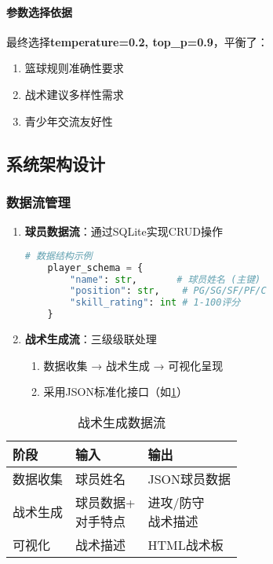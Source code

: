 \documentclass{article}
\theoremstyle{plain}
\theoremstyle{definition}
\theoremstyle{remark}
\begin{document}
\paragraph{参数选择依据}
最终选择\textbf{temperature=0.2, top\_p=0.9}，平衡了：
\begin{enumerate}
\item 篮球规则准确性要求
\item 战术建议多样性需求
\item 青少年交流友好性
\end{enumerate}


\subsection{系统架构设计}

\subsubsection{数据流管理}
\begin{enumerate}
    \item \textbf{球员数据流}：通过SQLite实现CRUD操作
    \begin{lstlisting}[language=Python]
    # 数据结构示例
    player_schema = {
        "name": str,       # 球员姓名 (主键)
        "position": str,    # PG/SG/SF/PF/C
        "skill_rating": int # 1-100评分
    }
    \end{lstlisting}
    
    \item \textbf{战术生成流}：三级级联处理
    \begin{enumerate}
        \item 数据收集 → 战术生成 → 可视化呈现
        \item 采用JSON标准化接口（如\cref{tactic-flow}）
    \end{enumerate}
\end{enumerate}

\begin{table}[h]
\caption{战术生成数据流}
\label{tactic-flow}
\centering
\begin{tabular}{lll}
\toprule
阶段 & 输入 & 输出 \\
\midrule
数据收集 & 球员姓名 & JSON球员数据 \\
战术生成 & \makecell{球员数据+\\对手特点} & \makecell{进攻/防守\\战术描述} \\
可视化 & 战术描述 & HTML战术板 \\
\bottomrule
\end{tabular}
\end{table}
\end{document}

